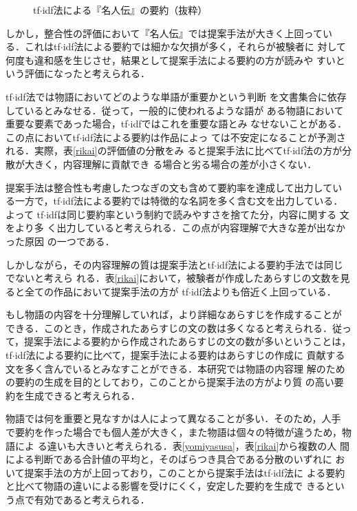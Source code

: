 \documentclass[japanese]{jnlp_1.4}
\begin{document}
\begin{figure}[t]

\vspace{-1\baselineskip}
\caption{tf$\cdot$idf法による『名人伝』の要約（抜粋）}\label{meijintf}
 \end{figure}

 しかし，整合性の評価において『名人伝』では提案手法が大きく上回ってい
 る．これはtf$\cdot$idf法による要約では細かな欠損が多く，それらが被験者に
 対して何度も違和感を生じさせ，結果として提案手法による要約の方が読みや
 すいという評価になったと考えられる．

 tf$\cdot$idf法では物語においてどのような単語が重要かという判断
 を文書集合に依存しているとみなせる．従って，一般的に使われるような語が
 ある物語において重要な要素であった場合，tf$\cdot$idfではこれを重要な語とみ
 なせないことがある．この点においてtf$\cdot$idf法による要約は作品によっ
 ては不安定になることが予測される．実際，表\ref{rikai}の評価値の分散をみ
 ると提案手法に比べてtf$\cdot$idf法の方が分散が大きく，内容理解に貢献でき
 る場合と劣る場合の差が小さくない．

 提案手法は整合性も考慮したつなぎの文も含めて要約率を達成して出力してい
 る一方で，tf$\cdot$idf法による要約では特徴的な名詞を多く含む文を出力している．よって
 tf$\cdot$idfは同じ要約率という制約で読みやすさを捨てた分，内容に関する
 文をより多
 く出力していると考えられる．この点が内容理解で大きな差が出なかった原因
 の一つである．

 しかしながら，その内容理解の質は提案手法とtf$\cdot$idf法による要約手法では同じでないと考えら
 れる．表\ref{rikai}において，被験者が作成したあらすじの文数を見ると全ての作品において提案手法の方が
 tf$\cdot$idf法よりも倍近く上回っている．
 
 もし物語の内容を十分理解していれば，より詳細なあらすじを作成することが
 できる．このとき，作成されたあらすじの文の数は多くなると考えられる．従っ
 て，提案手法による要約から作成されたあらすじの文の数が多いということは，
 tf$\cdot$idf法による要約に比べて，提案手法による要約はあらすじの作成に
 貢献する文を多く含んでいるとみなすことができる．本研究では物語の内容理
 解のための要約の生成を目的としており，このことから提案手法の方がより質
 の高い要約を生成できると考えられる．

 物語では何を重要と見なすかは人によって異なることが多い．そのため，人手
 で要約を作った場合でも個人差が大きく，また物語は個々の特徴が違うため，物語によ
 る違いも大きいと考えられる．表\ref{yomiyasusa}，表\ref{rikai}から複数の人
 間による判断である合計値の平均と，そのばらつき具合である分散のいずれに
 おいて提案手法の方が上回っており，このことから提案手法はtf$\cdot$idf法に
 よる要約と比べて物語の違いによる影響を受けにくく，安定した要約を生成で
 きるという点で有効であると考えられる．
\end{document}
